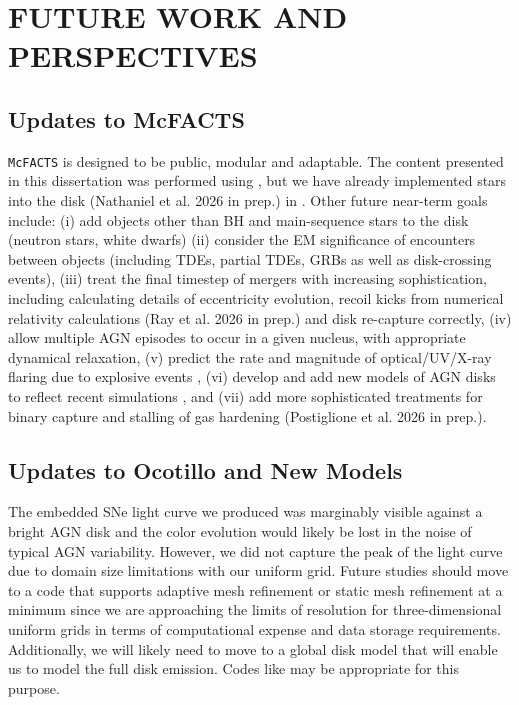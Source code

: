 \section{\texorpdfstring{\MakeUppercase{future work and perspectives}}{future work and perspectives}}
\label{sec:chapter-future}



\subsection{Updates to McFACTS}
\texttt{McFACTS} is designed to be public, modular and adaptable.
The content presented in this dissertation was performed using , but we have already implemented stars into the disk (Nathaniel et al. 2026 in prep.) in .
Other future near-term goals include:
(i) add objects other than BH and main-sequence stars to the disk (neutron stars, white dwarfs)
(ii) consider the EM significance of encounters between objects (including TDEs, partial TDEs, GRBs as well as disk-crossing events),
(iii) treat the final timestep of mergers with increasing sophistication, including calculating details of eccentricity evolution, recoil kicks from numerical relativity calculations (Ray et al. 2026 in prep.) and disk re-capture correctly,
(iv) allow multiple AGN episodes to occur in a given nucleus, with appropriate dynamical relaxation, (v) predict the rate and magnitude of optical/UV/X-ray flaring due to explosive events \citep[mergers, disk-crossings, SNe, TDEs,][]{McPike+26-mcfactsIV},
(vi) develop and add new models of AGN disks to reflect recent simulations \citep{Hopkins+24}, and
(vii) add more sophisticated treatments for binary capture \citep{Whitehead+25b} and stalling of gas hardening (Postiglione et al. 2026 in prep.).

\subsection{Updates to Ocotillo and New Models}


The embedded SNe light curve we produced was marginably visible against a bright AGN disk and the color evolution would likely be lost in the noise of typical AGN variability. 
However, we did not capture the peak of the light curve due to domain size limitations with our uniform grid.
Future studies should move to a code that supports adaptive mesh refinement or static mesh refinement at a minimum since we are approaching the limits of resolution for three-dimensional uniform grids in terms of computational expense and data storage requirements.
Additionally, we will likely need to move to a global disk model that will enable us to model the full disk emission.
Codes like \citep[][]{Stone+20} may be appropriate for this purpose.

